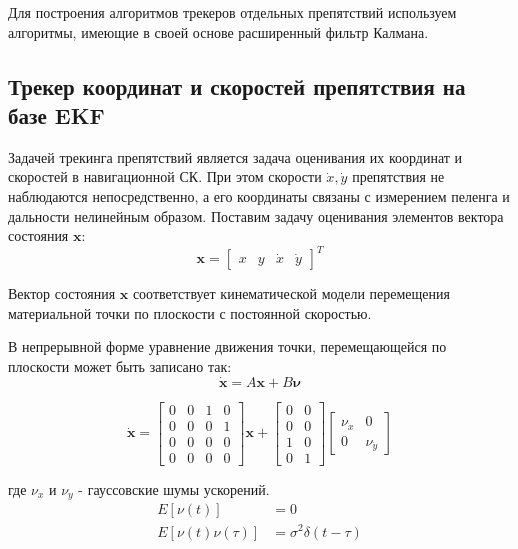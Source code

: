\documentclass[14pt]{article}
\begin{document}
Для построения алгоритмов трекеров отдельных препятствий используем алгоритмы, имеющие в своей основе расширенный фильтр Калмана. 

\subsection{Трекер координат и скоростей препятствия на базе EKF}
Задачей трекинга препятствий является задача оценивания их координат и скоростей в навигационной СК. При этом скорости $\dot x, \dot y$  препятствия  не наблюдаются непосредственно, а его координаты связаны с измерением пеленга и дальности нелинейным образом. Поставим задачу оценивания элементов вектора состояния $\boldsymbol x$:
\begin{equation}
	\boldsymbol x = \begin{bmatrix} x & y & \dot x & \dot y \end{bmatrix}^T
\end{equation}

Вектор состояния $\boldsymbol x$ соответствует кинематической модели перемещения материальной точки по плоскости с постоянной скоростью. 

В непрерывной форме уравнение движения точки, перемещающейся по плоскости может быть записано так:
\begin{equation}
	\dot{\boldsymbol x} = A\boldsymbol x + B\boldsymbol \nu
\end{equation}

\begin{equation}\label{equ_6_th_order}
	\dot{\boldsymbol x} = 
	\begin{bmatrix}
		 0 & 0 & 1 & 0 \\
		 0 & 0 & 0 & 1 \\
                 0 & 0 & 0 & 0 \\
                 0 & 0 & 0 & 0 
	 \end{bmatrix}\boldsymbol x + 
	\begin{bmatrix}
		0 & 0 \\ 0 & 0 \\ 1 & 0 \\ 0 & 1
	\end{bmatrix}
	\begin{bmatrix}
		\nu_{\dot x} & 0 \\ 0 & \nu_{\dot y}
	\end{bmatrix}
\end{equation}

где $\nu_x$ и $\nu_y$ - гауссовские шумы ускорений.
\begin{align}
	E\left[\nu(t)\right] &= 0\\
	E\left[\nu(t)\nu(\tau)\right] &= \sigma^2\delta(t-\tau)
\end{align}
\end{document}
